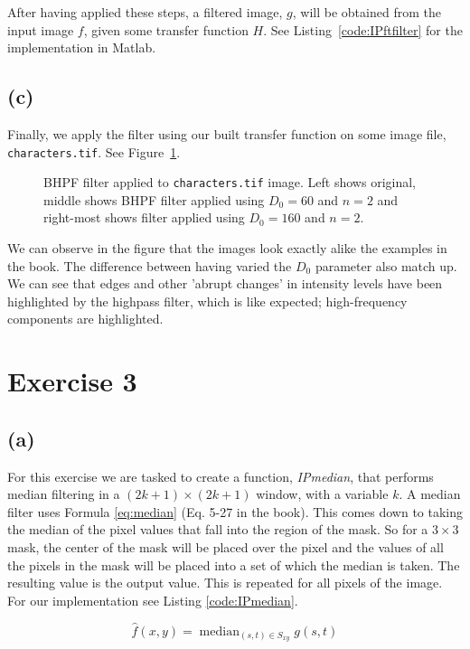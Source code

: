\documentclass{article}
\begin{document}
After having applied these steps, a filtered image, $g$, will be obtained from the input image $f$, given some transfer function $H$. See  Listing~\ref{code:IPftfilter} for the implementation in Matlab.

\subsection*{(c)} Finally, we apply the filter using our built transfer function on some image file, \texttt{characters.tif}. See Figure~\ref{fig:characters_all_bhpf}.

\begin{figure}[ht]
    \centering
    
    \caption{BHPF filter applied to \texttt{characters.tif} image. Left shows original, middle shows BHPF filter applied using $D_0 = 60$ and $n = 2$ and right-most shows filter applied using $D_0 = 160$ and $n = 2$.}
    \label{fig:characters_all_bhpf}
\end{figure}

We can observe in the figure that the images look exactly alike the examples in the book. The difference between having varied the $D_0$ parameter also match up. We can see that edges and other 'abrupt changes' in intensity levels have been highlighted by the highpass filter, which is like expected; high-frequency components are highlighted.

\section*{Exercise 3}
\subsection*{(a)}
For this exercise we are tasked to create a function, \textit{IPmedian}, that performs median filtering in a $(2k + 1) \times (2k + 1)$ window, with a variable $k$. A median filter uses Formula \ref{eq:median} (Eq. 5-27 in the book). This comes down to taking the median of the pixel values that fall into the region of the mask. So for a $3 \times 3$ mask, the center of the mask will be placed over the pixel and the values of all the pixels in the mask will be placed into a set of which the median is taken. The resulting value is the output value. This is repeated for all pixels of the image. For our implementation see  Listing \ref{code:IPmedian}.

\begin{equation}\label{eq:median}
    \widehat{f}(x, y)=\operatorname{median}_{(s, t) \in S_{x y}} g(s, t)
\end{equation}
\end{document}
